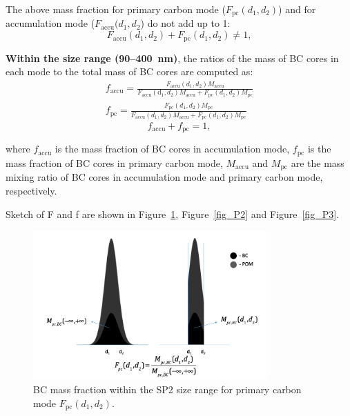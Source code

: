 \documentclass[11pt]{article}
\begin{document}
	The above mass fraction for primary carbon mode ($F_{\text{pc}}(d_{1}, d_{2})$) and for accumulation mode ($F_{\text{accu}}(d_{1}, d_{2}$) do not add up to 1:
	\[F_{\text{accu}}(d_{1}, d_{2}) + F_{\text{pc}}(d_{1}, d_{2}) \neq 1,\]
	
	
	
	\textbf{Within the size range (90--400~nm)}, the ratios of the mass of BC cores in each mode to the total mass of BC cores are computed as:
	\begin{align*}
	f_{\text{accu}} = \frac{F_{\text{accu}}(d_{1}, d_{2})M_{\text{accu}}}{F_{\text{accu}}(\text{d}_{1}, d_{2})M_{\text{accu}}+F_{\text{pc}}(d_{1}, d_{2})M_{\text{pc}}}\\
	f_{\text{pc}} = \frac{F_{\text{pc}}(d_{1}, d_{2})M_{\text{pc}}}{F_{\text{accu}}(d_{1}, d_{2})M_{\text{accu}}+F_{\text{pc}}(d_{1}, d_{2})M_{\text{pc}}}
	\end{align*}
	\[f_{\text{accu}} + f_{\text{pc}} = 1,\]
	
	where $f_{\text{accu}}$ is the mass fraction of BC cores in
	accumulation mode, $f_{\text{pc}}$ is the mass fraction of BC cores in
	primary carbon mode, $M_{\text{accu}}$ and $M_{\text{pc}}$ are the mass mixing ratio of BC cores
	in accumulation mode and primary carbon mode, respectively.
	
	Sketch of F and f are shown in Figure~\ref{fig_P1}, Figure~\ref{fig_P2} and Figure~\ref{fig_P3}.
	
	\begin{figure}[!h] 
		\begin{center}
			\includegraphics[width = 0.8\textwidth]{Rplot05}
			\caption[]{\label{fig_P1} BC mass fraction within the SP2 size range for primary carbon mode $F_{\text{pc}}(d_{1}, d_{2})$.}
		\end{center}
	\end{figure}
	
\end{document}
